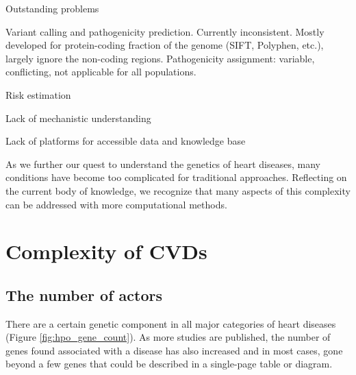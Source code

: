 \documentclass[letter]{bioinfo}
\begin{document}
Outstanding problems

Variant calling and pathogenicity prediction. Currently inconsistent. Mostly developed for protein-coding fraction of the genome (SIFT, Polyphen, etc.), largely ignore the non-coding regions.
Pathogenicity assignment: variable, conflicting, not applicable for all populations.

Risk estimation

Lack of mechanistic understanding

Lack of platforms for accessible data and knowledge base


As we further our quest to understand the genetics of heart diseases, many conditions have become too complicated for traditional approaches. Reflecting on the current body of knowledge, we recognize that many aspects of this complexity can be addressed with more computational methods.



\section{Complexity of CVDs}  %

\subsection{The number of actors}

% 
There are a certain genetic component in all major categories of heart diseases (Figure \ref{fig:hpo_gene_count}). As more studies are published, the number of genes found associated with a disease has also increased and in most cases, gone beyond a few genes that could be described in a single-page table or diagram.
\end{document}
